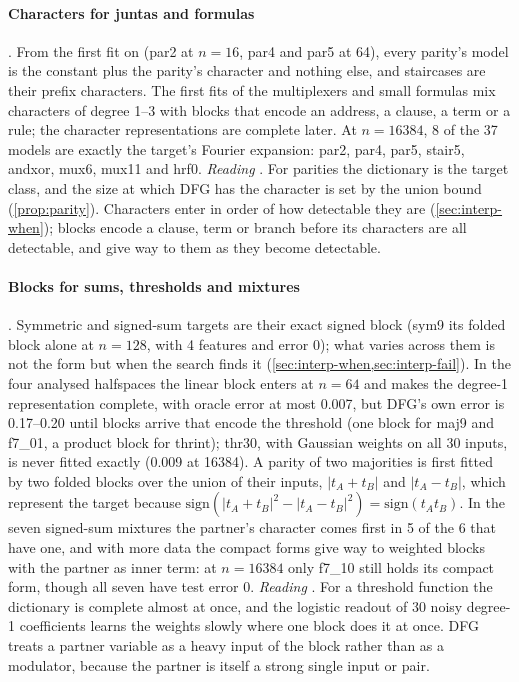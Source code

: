 \paragraph{Characters for juntas and formulas} . From the first fit on (par2 at $n=16$, par4 and par5 at 64), every parity's model is the constant plus the parity's character and nothing else, and staircases are their prefix characters. The first fits of the multiplexers and small formulas mix characters of degree 1--3 with blocks that encode an address, a clause, a term or a rule; the character representations are complete later. At $n=16384$, 8 of the 37 models are exactly the target's Fourier expansion: par2, par4, par5, stair5, andxor, mux6, mux11 and hrf0. \emph{Reading} . For parities the dictionary is the target class, and the size at which DFG has the character is set by the union bound (\cref{prop:parity}). Characters enter in order of how detectable they are (\cref{sec:interp-when}); blocks encode a clause, term or branch before its characters are all detectable, and give way to them as they become detectable.

\paragraph{Blocks for sums, thresholds and mixtures} . Symmetric and signed-sum targets are their exact signed block (sym9 its folded block alone at $n=128$, with 4 features and error 0); what varies across them is not the form but when the search finds it (\cref{sec:interp-when,sec:interp-fail}). In the four analysed halfspaces the linear block enters at $n=64$ and makes the degree-1 representation complete, with oracle error at most 0.007, but DFG's own error is 0.17--0.20 until blocks arrive that encode the threshold (one block for maj9 and f7\_01, a product block for thrint); thr30, with Gaussian weights on all 30 inputs, is never fitted exactly (0.009 at 16384). A parity of two majorities is first fitted by two folded blocks over the union of their inputs, $|t_A+t_B|$ and $|t_A-t_B|$, which represent the target because $\mathrm{sign}(|t_A+t_B|^2-|t_A-t_B|^2)=\mathrm{sign}(t_At_B)$. In the seven signed-sum mixtures the partner's character comes first in 5 of the 6 that have one, and with more data the compact forms give way to weighted blocks with the partner as inner term: at $n=16384$ only f7\_10 still holds its compact form, though all seven have test error 0. \emph{Reading} . For a threshold function the dictionary is complete almost at once, and the logistic readout of 30 noisy degree-1 coefficients learns the weights slowly where one block does it at once. DFG treats a partner variable as a heavy input of the block rather than as a modulator, because the partner is itself a strong single input or pair.

